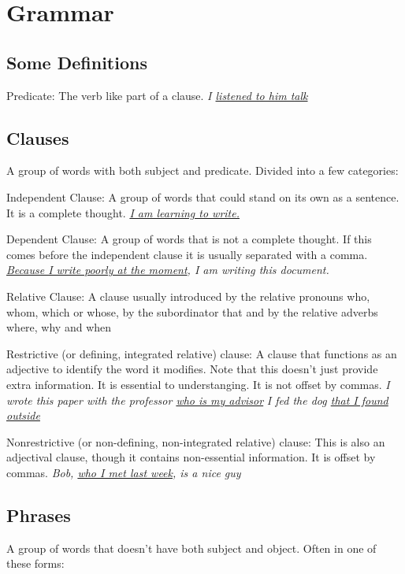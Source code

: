 \documentclass{article}
\newcommand{\hl}[1]{\underline{#1}}
\newcommand{\example}[1]{\textit{#1}}
\begin{document}
\section{Grammar}


\subsection{Some Definitions}

Predicate: The verb like part of a clause.
\example{I \hl{listened to him talk}}

\subsection{Clauses}

A group of words with both subject and predicate. Divided into a few categories:

Independent Clause: A group of words that could stand on its own as a sentence. It is a complete thought.
\example{\hl{I am learning to write.}}


Dependent Clause: A group of words that is not a complete thought. If this comes before the independent clause it is usually separated with a comma.
\example{\hl{Because I write poorly at the moment}, I am writing this document.}

Relative Clause: A clause usually introduced by the relative pronouns who, whom, which or whose, by the subordinator that and by the relative adverbs where, why and when


Restrictive (or defining, integrated relative) clause: A clause that functions as an adjective to identify the word it modifies. Note that this doesn't just provide extra information. It is essential to understanging. It is not offset by commas.
\example{I wrote this paper with the professor \hl{who is my advisor}}
\example{I fed the dog \hl{that I found outside}}

Nonrestrictive (or non-defining, non-integrated relative) clause: This is also an adjectival clause, though it contains non-essential information. It is offset by commas.
\example{Bob, \hl{who I met last week}, is a nice guy}


\subsection{Phrases}

A group of words that doesn't have both subject and object. Often in one of these forms:
\end{document}
